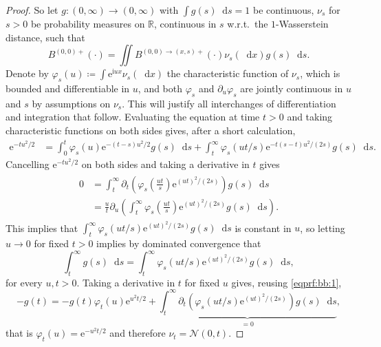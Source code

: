 \documentclass[reqno,draft]{amsart}
\numberwithin{equation}{section}
\theoremstyle{plain}
\theoremstyle{remark}
\newcommand{\R}{\mathbb{R}} %
\newcommand*\diff{\mathop{}\!\mathrm{d}}
\newcommand{\e}{\mathrm{e}}
\begin{document}
\begin{proof}
    So let $g\colon (0,\infty) \to (0,\infty)$ with $\int g(s) \diff s = 1$ be continuous, $\nu_s$ for $s > 0$ be probability measures on $\R$, continuous in $s$ w.r.t.\ the $1$-Wasserstein distance, such that \[
        B^{(0,0)+}(\cdot ) = \iint B^{(0,0)\to (x,s)+}(\cdot ) \nu_s(\diff x) g(s) \diff s.
    \] Denote by $\varphi_s(u) \coloneqq \int \e^{\mathrm{i} u x}\nu_s(\diff x)$ the characteristic function of $\nu_s$, which is bounded and differentiable in $u$, and both $\varphi_s$ and $\partial_u \varphi_s$ are jointly continuous in $u$ and $s$ by assumptions on $\nu_s$. This will justify all interchanges of differentiation and integration that follow. Evaluating the equation at time $t > 0$ and taking characteristic functions on both sides gives, after a short calculation, 
    \begin{align*}
        \e^{-t u^2 / 2}
        &= \int_0^t \varphi_{s}(u) \e^{-(t-s)u^2 / 2} g(s) \diff s + \int_t^\infty \varphi_s(u t / s) \e^{-t(s-t) u^2 / (2s)} g(s) \diff s.
    \end{align*}
    Cancelling $\e^{-t u^2 / 2}$ on both sides and taking a derivative in $t$ gives 
        \begin{align}\begin{split}\label{eqprf:bb:1}
            0 &= \int_t^\infty \partial_t \left( \varphi_s\left( {\textstyle\frac{ut}{s}} \right)  \e^{(ut)^2 / (2s)} \right) g(s)\diff s \\
                &= \frac{u}{t} \partial_u \left( \int_t^\infty \varphi_s\left( {\textstyle\frac{ut}{s}} \right) \e^{(ut)^2 / (2s)} g(s) \diff s \right).
        \end{split}\end{align}
        This implies that $\int_t^\infty \varphi_s(ut / s) \e^{(ut)^2 / (2s)} g(s) \diff s$ is constant in $u$, so letting $u \to 0$ for fixed $t > 0$ implies by dominated convergence that \[
        \int_t^\infty g(s) \diff s = \int_t^\infty \varphi_s(ut / s) \e^{(ut)^2 / (2s)}g(s) \diff s,
        \] for every $u,t > 0$. Taking a derivative in $t$ for fixed $u$ gives, reusing \cref{eqprf:bb:1}, \[
        -g(t) = -g(t) \varphi_t(u) \e^{u^2 t / 2} + \underbrace{\int_t^\infty \partial_t \left( \varphi_s(ut / s) \e^{(ut)^2 / (2s)} \right) g(s) \diff s}_{= 0} ,
    \] that is $\varphi_t(u) = \e^{-u^2 t / 2}$ and therefore $\nu_t = \mathcal{N}(0,t)$.


\end{proof}
\end{document}
